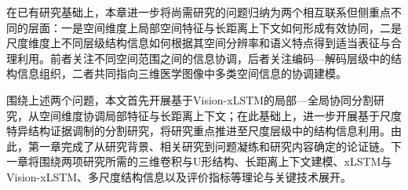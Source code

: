 在已有研究基础上，本章进一步将尚需研究的问题归纳为两个相互联系但侧重点不同的层面：一是空间维度上局部空间特征与长距离上下文如何形成有效协同，二是尺度维度上不同层级结构信息如何根据其空间分辨率和语义特点得到适当表征与合理利用。前者关注不同空间范围之间的信息协调，后者关注编码—解码层级中的结构信息组织，二者共同指向三维医学图像中多类空间信息的协调建模。

围绕上述两个问题，本文首先开展基于Vision-xLSTM的局部—全局协同分割研究，从空间维度协调局部特征与长距离上下文；在此基础上，进一步开展基于尺度特异结构证据调制的分割研究，将研究重点推进至尺度层级中的结构信息利用。由此，第一章完成了从研究背景、相关研究到问题凝练和研究内容确定的论证链。下一章将围绕两项研究所需的三维卷积与U形结构、长距离上下文建模、xLSTM与Vision-xLSTM、多尺度结构信息以及评价指标等理论与关键技术展开。
